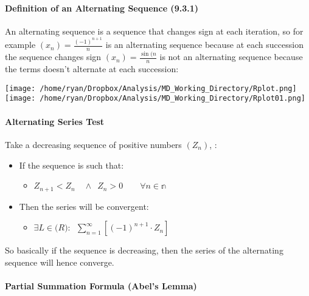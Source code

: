 \documentclass[
]{article}
\let\oldparagraph\paragraph
\renewcommand{\paragraph}[1]{\oldparagraph{#1}\mbox{}}
\begin{document}
\hypertarget{header-n3287}{%
\paragraph{Definition of an Alternating Sequence
(9.3.1)}\label{header-n3287}}

An alternating sequence is a sequence that changes sign at each
iteration, so for example \((x_n) = \frac{(-1)^{n+1}}{n}\) is an
alternating sequence because at each succession the sequence changes
sign \((x_n) = \frac{\sin(n}{n}\) is not an alternating sequence because
the terms doesn't alternate at each succession:

\texttt{[image: /home/ryan/Dropbox/Analysis/MD\_Working\_Directory/Rplot.png]}
\texttt{[image: /home/ryan/Dropbox/Analysis/MD\_Working\_Directory/Rplot01.png]}

\hypertarget{header-n3292}{%
\paragraph{Alternating Series Test}\label{header-n3292}}

Take a decreasing sequence of positive numbers \((Z_n)\), :

\begin{itemize}
\item
  If the sequence is such that:

  \begin{itemize}
  \item
    \(Z_{n+1} < Z_n \enspace  \enspace \wedge \enspace Z_n > 0 \qquad \forall n \in \mathbb{n}\)
  \end{itemize}
\item
  Then the series will be convergent:

  \begin{itemize}
  \item
    \(\exists L \in \mathbb(R): \enspace \sum^\infty_{n=1} \left[ (-1)^{n+1} \cdot Z_n \right]\)
  \end{itemize}
\end{itemize}

So basically if the sequence is decreasing, then the series of the
alternating sequence will hence converge.

\hypertarget{header-n3307}{%
	\newpage
\paragraph{Partial Summation Formula (Abel's
Lemma)}\label{header-n3307}}
\end{document}
